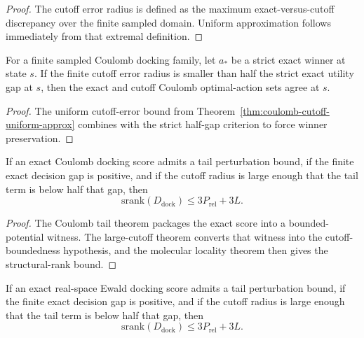\begin{proof}
The cutoff error radius is defined as the maximum exact-versus-cutoff discrepancy over the finite sampled domain. Uniform approximation follows immediately from that extremal definition.
\end{proof}

\begin{theorem}\label{thm:coulomb-cutoff-invariance}
For a finite sampled Coulomb docking family, let $a_\ast$ be a strict exact winner at state $s$. If the finite cutoff error radius is smaller than half the strict exact utility gap at $s$, then the exact and cutoff Coulomb optimal-action sets agree at $s$.
\end{theorem}

\begin{proof}
The uniform cutoff-error bound from Theorem~\ref{thm:coulomb-cutoff-uniform-approx} combines with the strict half-gap criterion to force winner preservation.
\end{proof}

\begin{theorem}\label{thm:coulomb-tail-srank}
If an exact Coulomb docking score admits a tail perturbation bound, if the finite exact decision gap is positive, and if the cutoff radius is large enough that the tail term is below half that gap, then
\[
\mathrm{srank}(D_{\mathrm{dock}}) \le 3P_{\mathrm{rel}} + 3L.
\]
\end{theorem}

\begin{proof}
The Coulomb tail theorem packages the exact score into a bounded-potential witness. The large-cutoff theorem converts that witness into the cutoff-boundedness hypothesis, and the molecular locality theorem then gives the structural-rank bound.
\end{proof}

\begin{theorem}\label{thm:ewald-tail-srank}
If an exact real-space Ewald docking score admits a tail perturbation bound, if the finite exact decision gap is positive, and if the cutoff radius is large enough that the tail term is below half that gap, then
\[
\mathrm{srank}(D_{\mathrm{dock}}) \le 3P_{\mathrm{rel}} + 3L.
\]
\end{theorem}

